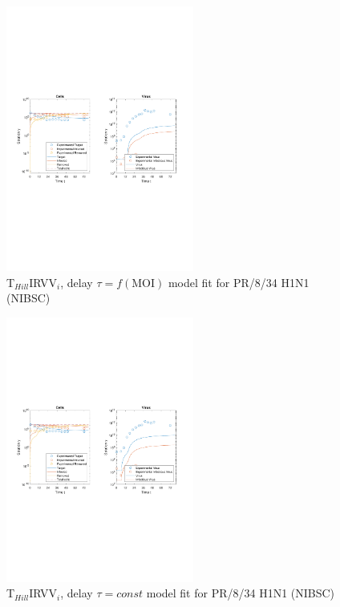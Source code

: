 \begin{figure}[H]
\begin{center}
\includegraphics[width=0.55\textwidth, trim={1cm 9.8cm 1cm 9.5cm}, clip]{D_chapters/6_appendix/4_ValidationNIBSC/InfectionDepletionModelTHillIRVViDelayMOI0.025log.pdf}
\caption[T$_{Hill}$IRVV$_i$, delay $\tau = f(\text{MOI})$ model fit forPR/8/34 H1N1 (NIBSC)]%
{T$_{Hill}$IRVV$_i$, delay $\tau = f(\text{MOI})$ model fit for PR/8/34 H1N1 (NIBSC)}
\label{figure:THillIRVViDelayValidationNIBSC}
\end{center}
\end{figure}

\begin{figure}[H]
\begin{center}
\includegraphics[width=0.55\textwidth, trim={1cm 9.8cm 1cm 9.5cm}, clip]{D_chapters/6_appendix/4_ValidationNIBSC/InfectionDepletionModelTHillIRVViDelayFitTauMOI0.025log.pdf}
\caption[T$_{Hill}$IRVV$_i$, delay $\tau = const$ model fit for PR/8/34 H1N1 (NIBSC)]%
{T$_{Hill}$IRVV$_i$, delay $\tau = const$ model fit for PR/8/34 H1N1 (NIBSC)}
\label{figure:THillIRVViDelayFitTauValidationNIBSC}
\end{center}
\end{figure}

